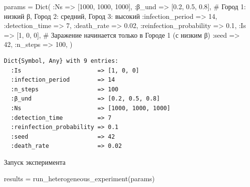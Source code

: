 \documentclass[
  12pt,
  a4paper,
  DIV=11,
  numbers=noendperiod]{scrreprt}
\newenvironment{Shaded}{\begin{snugshade}}{\end{snugshade}}
\newcommand{\CommentTok}[1]{\textcolor[rgb]{0.37,0.37,0.37}{#1}}
\newcommand{\FloatTok}[1]{\textcolor[rgb]{0.68,0.00,0.00}{#1}}
\newcommand{\FunctionTok}[1]{\textcolor[rgb]{0.28,0.35,0.67}{#1}}
\newcommand{\NormalTok}[1]{\textcolor[rgb]{0.00,0.23,0.31}{#1}}
\newcommand{\OperatorTok}[1]{\textcolor[rgb]{0.37,0.37,0.37}{#1}}
\begin{document}
\begin{Shaded}
\begin{Highlighting}[]
\NormalTok{params }\OperatorTok{=} \FunctionTok{Dict}\NormalTok{(}
    \OperatorTok{:}\NormalTok{Ns }\OperatorTok{=\textgreater{}}\NormalTok{ [}\FloatTok{1000}\NormalTok{, }\FloatTok{1000}\NormalTok{, }\FloatTok{1000}\NormalTok{],}
    \OperatorTok{:}\NormalTok{β\_und }\OperatorTok{=\textgreater{}}\NormalTok{ [}\FloatTok{0.2}\NormalTok{, }\FloatTok{0.5}\NormalTok{, }\FloatTok{0.8}\NormalTok{],  }\CommentTok{\# Город 1: низкий β, Город 2: средний, Город 3: высокий}
    \OperatorTok{:}\NormalTok{infection\_period }\OperatorTok{=\textgreater{}} \FloatTok{14}\NormalTok{,}
    \OperatorTok{:}\NormalTok{detection\_time }\OperatorTok{=\textgreater{}} \FloatTok{7}\NormalTok{,}
    \OperatorTok{:}\NormalTok{death\_rate }\OperatorTok{=\textgreater{}} \FloatTok{0.02}\NormalTok{,}
    \OperatorTok{:}\NormalTok{reinfection\_probability }\OperatorTok{=\textgreater{}} \FloatTok{0.1}\NormalTok{,}
    \OperatorTok{:}\NormalTok{Is }\OperatorTok{=\textgreater{}}\NormalTok{ [}\FloatTok{1}\NormalTok{, }\FloatTok{0}\NormalTok{, }\FloatTok{0}\NormalTok{],  }\CommentTok{\# Заражение начинается только в Городе 1 (с низким β)}
    \OperatorTok{:}\NormalTok{seed }\OperatorTok{=\textgreater{}} \FloatTok{42}\NormalTok{,}
    \OperatorTok{:}\NormalTok{n\_steps }\OperatorTok{=\textgreater{}} \FloatTok{100}\NormalTok{,}
\NormalTok{)}
\end{Highlighting}
\end{Shaded}

\begin{verbatim}
Dict{Symbol, Any} with 9 entries:
  :Is                      => [1, 0, 0]
  :infection_period        => 14
  :n_steps                 => 100
  :β_und                   => [0.2, 0.5, 0.8]
  :Ns                      => [1000, 1000, 1000]
  :detection_time          => 7
  :reinfection_probability => 0.1
  :seed                    => 42
  :death_rate              => 0.02
\end{verbatim}

Запуск эксперимента

\begin{Shaded}
\begin{Highlighting}[]
\NormalTok{results }\OperatorTok{=} \FunctionTok{run\_heterogeneous\_experiment}\NormalTok{(params)}
\end{Highlighting}
\end{Shaded}
\end{document}
